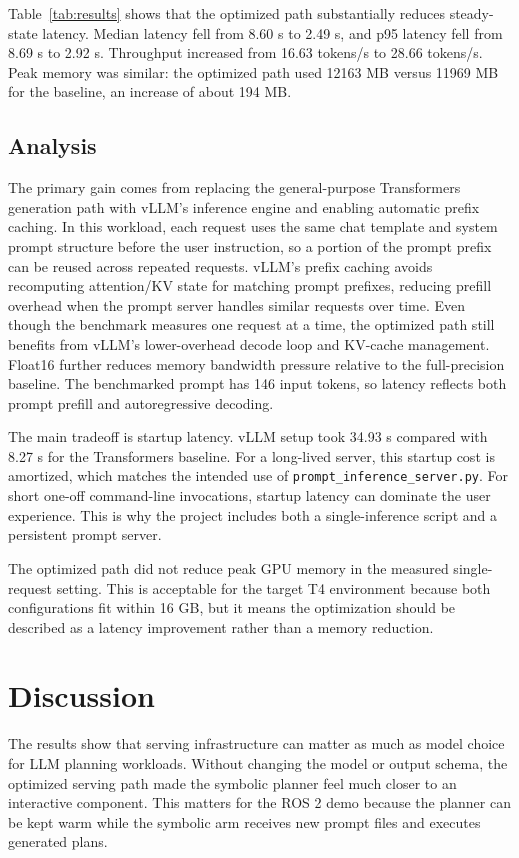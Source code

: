 \documentclass[conference]{IEEEtran}
\begin{document}
Table~\ref{tab:results} shows that the optimized path substantially reduces steady-state latency. Median latency fell from 8.60 s to 2.49 s, and p95 latency fell from 8.69 s to 2.92 s. Throughput increased from 16.63 tokens/s to 28.66 tokens/s. Peak memory was similar: the optimized path used 12163 MB versus 11969 MB for the baseline, an increase of about 194 MB.

\subsection{Analysis}

The primary gain comes from replacing the general-purpose Transformers generation path with vLLM’s inference engine and enabling automatic prefix caching. In this workload, each request uses the same chat template and system prompt structure before the user instruction, so a portion of the prompt prefix can be reused across repeated requests. vLLM’s prefix caching avoids recomputing attention/KV state for matching prompt prefixes, reducing prefill overhead when the prompt server handles similar requests over time. Even though the benchmark measures one request at a time, the optimized path still benefits from vLLM’s lower-overhead decode loop and KV-cache management. Float16 further reduces memory bandwidth pressure relative to the full-precision baseline. The benchmarked prompt has 146 input tokens, so latency reflects both prompt prefill and autoregressive decoding.

The main tradeoff is startup latency. vLLM setup took 34.93 s compared with 8.27 s for the Transformers baseline. For a long-lived server, this startup cost is amortized, which matches the intended use of \texttt{prompt\_inference\_server.py}. For short one-off command-line invocations, startup latency can dominate the user experience. This is why the project includes both a single-inference script and a persistent prompt server.

The optimized path did not reduce peak GPU memory in the measured single-request setting. This is acceptable for the target T4 environment because both configurations fit within 16 GB, but it means the optimization should be described as a latency improvement rather than a memory reduction.

\section{Discussion}

The results show that serving infrastructure can matter as much as model choice for LLM planning workloads. Without changing the model or output schema, the optimized serving path made the symbolic planner feel much closer to an interactive component. This matters for the ROS 2 demo because the planner can be kept warm while the symbolic arm receives new prompt files and executes generated plans.
\end{document}
